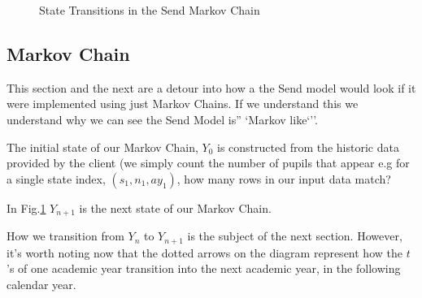 \documentclass[margin=5mm]{article}
\begin{document}
\begin{figure}[h!]
  \caption{State Transitions in the Send Markov Chain\label{state}
  }
\end{figure}

\subsection{Markov Chain}

This section and the next are a detour into how a the Send model would
look if it were implemented using just Markov Chains.  If we
understand this we understand why we can see the Send Model is''
`Markov like`''.

The initial state of our Markov Chain, $Y_0$ is constructed from the
historic data provided by the client (we simply count the number of
pupils that appear e.g for a single state index, $(s_1,n_1,ay_1)$, how
many rows in our input data match?

In Fig.\ref{state} $Y_{n+1}$ is the next state of our Markov Chain.

How we transition from $Y_{n}$ to $Y_{n+1}$ is the subject of the next
section.  However, it's worth noting now that the dotted arrows on the
diagram represent how the $t$'s of one academic year transition into
the next academic year, in the following calendar year.
\end{document}
